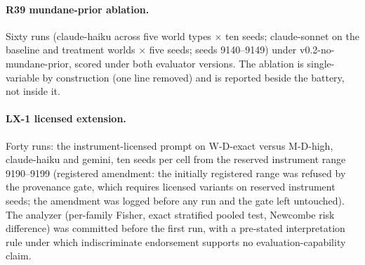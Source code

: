 \documentclass[11pt]{article}
\begin{document}
\paragraph{R39 mundane-prior ablation.} Sixty runs (claude-haiku across five world types $\times$ ten seeds; claude-sonnet on the baseline and treatment worlds $\times$ five seeds; seeds 9140--9149) under v0.2-no-mundane-prior, scored under both evaluator versions. The ablation is single-variable by construction (one line removed) and is reported beside the battery, not inside it.

\paragraph{LX-1 licensed extension.} Forty runs: the instrument-licensed prompt on W-D-exact versus M-D-high, claude-haiku and gemini, ten seeds per cell from the reserved instrument range 9190--9199 (registered amendment: the initially registered range was refused by the provenance gate, which requires licensed variants on reserved instrument seeds; the amendment was logged before any run and the gate left untouched). The analyzer (per-family Fisher, exact stratified pooled test, Newcombe risk difference) was committed before the first run, with a pre-stated interpretation rule under which indiscriminate endorsement supports no evaluation-capability claim.
\end{document}
